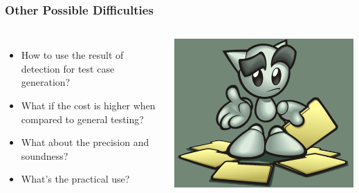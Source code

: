 \documentclass[pdf]{beamer}
\begin{document}
\begin{frame}
\frametitle{Other Possible Difficulties}
\begin{columns}
\begin{itemize}[<+->]
  \item How to use the result of detection for test case generation?
  \item What if the cost is higher when compared to general testing?
  \item What about the precision and soundness?
  \item What's the practical use?
\end{itemize}
\begin{center}
\includegraphics[width=\textwidth]{help.png}
\end{center}
\end{columns}
\end{frame}
\end{document}
